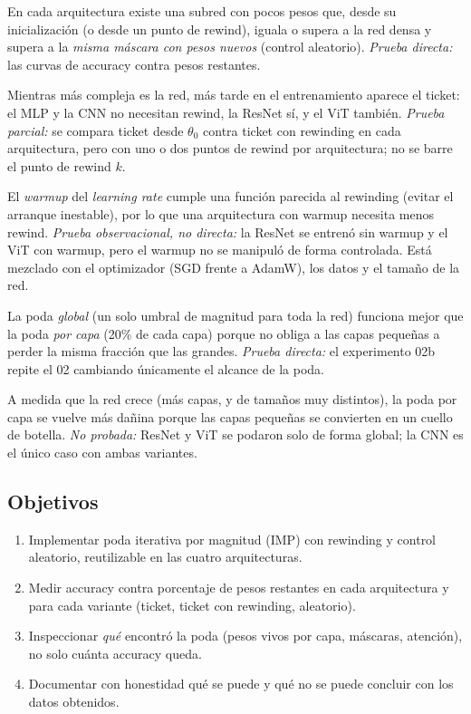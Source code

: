 \documentclass[11pt]{article}
\begin{document}
\begin{description}[style=nextline,leftmargin=1.2em]
\item[H0 -- Existencia.] En cada arquitectura existe una subred con pocos pesos que, desde su inicialización (o desde un punto de rewind), iguala o supera a la red densa y supera a la \textit{misma máscara con pesos nuevos} (control aleatorio). \textit{Prueba directa:} las curvas de accuracy contra pesos restantes.
\item[H1 -- Complejidad y rewinding.] Mientras más compleja es la red, más tarde en el entrenamiento aparece el ticket: el MLP y la CNN no necesitan rewind, la ResNet sí, y el ViT también. \textit{Prueba parcial:} se compara ticket desde $\theta_0$ contra ticket con rewinding en cada arquitectura, pero con uno o dos puntos de rewind por arquitectura; no se barre el punto de rewind $k$.
\item[H2 -- Warmup.] El \textit{warmup} del \textit{learning rate} cumple una función parecida al rewinding (evitar el arranque inestable), por lo que una arquitectura con warmup necesita menos rewind. \textit{Prueba observacional, no directa:} la ResNet se entrenó sin warmup y el ViT con warmup, pero el warmup no se manipuló de forma controlada. Está mezclado con el optimizador (SGD frente a AdamW), los datos y el tamaño de la red.
\item[H3a -- Alcance de la poda (CNN).] La poda \textit{global} (un solo umbral de magnitud para toda la red) funciona mejor que la poda \textit{por capa} (20\% de cada capa) porque no obliga a las capas pequeñas a perder la misma fracción que las grandes. \textit{Prueba directa:} el experimento 02b repite el 02 cambiando únicamente el alcance de la poda.
\item[H3b -- Redes más grandes necesitan poda global.] A medida que la red crece (más capas, y de tamaños muy distintos), la poda por capa se vuelve más dañina porque las capas pequeñas se convierten en un cuello de botella. \textit{No probada:} ResNet y ViT se podaron solo de forma global; la CNN es el único caso con ambas variantes.
\end{description}

\subsection{Objetivos}
\begin{enumerate}[nosep]
    \item Implementar poda iterativa por magnitud (IMP) con rewinding y control aleatorio, reutilizable en las cuatro arquitecturas.
    \item Medir accuracy contra porcentaje de pesos restantes en cada arquitectura y para cada variante (ticket, ticket con rewinding, aleatorio).
    \item Inspeccionar \textit{qué} encontró la poda (pesos vivos por capa, máscaras, atención), no solo cuánta accuracy queda.
    \item Documentar con honestidad qué se puede y qué no se puede concluir con los datos obtenidos.
\end{enumerate}
\end{document}
